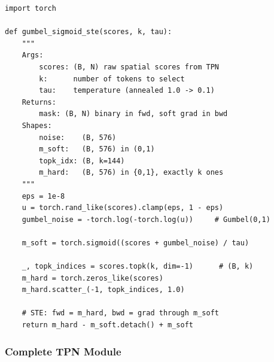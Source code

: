 \documentclass[11pt,a4paper]{article}
\begin{document}
\begin{lstlisting}[caption={Gumbel-Sigmoid STE (complete, verified).}]
import torch

def gumbel_sigmoid_ste(scores, k, tau):
    """
    Args:
        scores: (B, N) raw spatial scores from TPN
        k:      number of tokens to select
        tau:    temperature (annealed 1.0 -> 0.1)
    Returns:
        mask: (B, N) binary in fwd, soft grad in bwd
    Shapes:
        noise:    (B, 576)
        m_soft:   (B, 576) in (0,1)
        topk_idx: (B, k=144)
        m_hard:   (B, 576) in {0,1}, exactly k ones
    """
    eps = 1e-8
    u = torch.rand_like(scores).clamp(eps, 1 - eps)
    gumbel_noise = -torch.log(-torch.log(u))     # Gumbel(0,1)

    m_soft = torch.sigmoid((scores + gumbel_noise) / tau)

    _, topk_indices = scores.topk(k, dim=-1)      # (B, k)
    m_hard = torch.zeros_like(scores)
    m_hard.scatter_(-1, topk_indices, 1.0)

    # STE: fwd = m_hard, bwd = grad through m_soft
    return m_hard - m_soft.detach() + m_soft
\end{lstlisting}

\subsubsection{Complete TPN Module}
\end{document}
